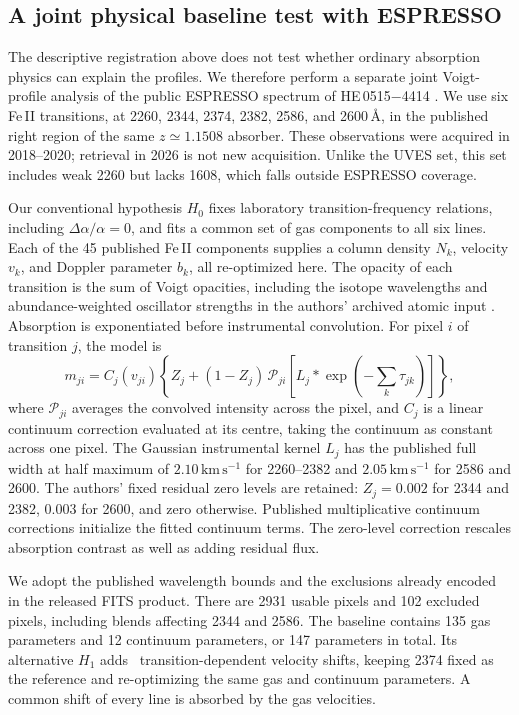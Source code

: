 \subsection{A joint physical baseline test with ESPRESSO}
\label{sec:espresso_null}

The descriptive registration above does not test whether ordinary absorption physics can explain the profiles. We therefore perform a separate joint Voigt-profile analysis of the public ESPRESSO spectrum of HE\,0515$-$4414 \cite{Murphy2022ESPRESSO}. We use six Fe\,II transitions, at 2260, 2344, 2374, 2382, 2586, and 2600\,\AA, in the published right region of the same $z\simeq1.1508$ absorber. These observations were acquired in 2018--2020; retrieval in 2026 is not new acquisition. Unlike the UVES set, this set includes weak 2260 but lacks 1608, which falls outside ESPRESSO coverage.

Our conventional hypothesis $H_0$ fixes laboratory transition-frequency relations, including $\Delta\alpha/\alpha=0$, and fits a common set of gas components to all six lines. Each of the 45 published Fe\,II components supplies a column density $N_k$, velocity $v_k$, and Doppler parameter $b_k$, all re-optimized here. The opacity of each transition is the sum of Voigt opacities, including the isotope wavelengths and abundance-weighted oscillator strengths in the authors' archived atomic input \cite{MurphyBerengut2014}. Absorption is exponentiated before instrumental convolution. For pixel $i$ of transition $j$, the model is
\begin{equation}
 m_{ji}=C_j(v_{ji})\left\{Z_j+(1-Z_j)\,
 \mathcal P_{ji}\!\left[L_j*\exp\!\left(-\sum_k\tau_{jk}\right)\right]\right\},
 \label{eq:espresso_null_model}
\end{equation}
where $\mathcal P_{ji}$ averages the convolved intensity across the pixel, and $C_j$ is a linear continuum correction evaluated at its centre, taking the continuum as constant across one pixel. The Gaussian instrumental kernel $L_j$ has the published full width at half maximum of $2.10\,\mathrm{km\,s^{-1}}$ for 2260--2382 and $2.05\,\mathrm{km\,s^{-1}}$ for 2586 and 2600. The authors' fixed residual zero levels are retained: $Z_j=0.002$ for 2344 and 2382, $0.003$ for 2600, and zero otherwise. Published multiplicative continuum corrections initialize the fitted continuum terms. The zero-level correction rescales absorption contrast as well as adding residual flux.

We adopt the published wavelength bounds and the exclusions already encoded in the released FITS product. There are 2931 usable pixels and 102 excluded pixels, including blends affecting 2344 and 2586. The baseline contains 135 gas parameters and 12 continuum parameters, or 147 parameters in total. Its alternative $H_1$ adds \EspressoAdded\ transition-dependent velocity shifts, keeping 2374 fixed as the reference and re-optimizing the same gas and continuum parameters. A common shift of every line is absorbed by the gas velocities.

